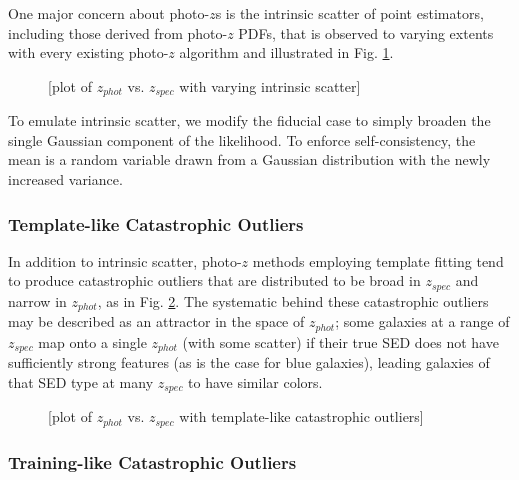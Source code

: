 \documentclass[iop]{emulateapj}
\begin{document}
One major concern about photo-$z$s is the intrinsic scatter of point estimators, including those derived from photo-$z$ PDFs, that is observed to varying extents with every existing photo-$z$ algorithm and illustrated in Fig. \ref{fig:intscat}.  

\begin{figure}
	\begin{center}
		\caption{[plot of $z_{phot}$ vs. $z_{spec}$ with varying intrinsic scatter]}
		\label{fig:intscat}
	\end{center}
\end{figure}

To emulate intrinsic scatter, we modify the fiducial case to simply broaden the single Gaussian component of the likelihood.  To enforce self-consistency, the mean is a random variable drawn from a Gaussian distribution with the newly increased variance.

\subsubsection{Template-like Catastrophic Outliers}
\label{sec:tempcatout}

In addition to intrinsic scatter, photo-$z$ methods employing template fitting tend to produce catastrophic outliers that are distributed to be broad in $z_{spec}$ and narrow in $z_{phot}$, as in Fig. \ref{fig:tempcatout}.  The systematic behind these catastrophic outliers may be described as an attractor in the space of $z_{phot}$; some galaxies at a range of $z_{spec}$ map onto a single $z_{phot}$ (with some scatter) if their true SED does not have sufficiently strong features (as is the case for blue galaxies), leading galaxies of that SED type at many $z_{spec}$ to have similar colors.

\begin{figure}
	\begin{center}
		\caption{[plot of $z_{phot}$ vs. $z_{spec}$ with template-like catastrophic outliers]}
		\label{fig:tempcatout}
	\end{center}
\end{figure}

\subsubsection{Training-like Catastrophic Outliers}
\label{sec:traincatout}
\end{document}
